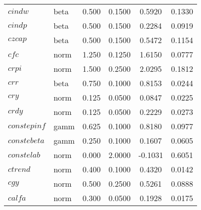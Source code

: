 \begin{center}
\begin{longtable}{llcccc}
$cindw$ & beta &   0.500 & 0.1500 &   0.5920 &  0.1330 \\ 
$cindp$ & beta &   0.500 & 0.1500 &   0.2284 &  0.0919 \\ 
$czcap$ & beta &   0.500 & 0.1500 &   0.5472 &  0.1154 \\ 
$cfc$ & norm &   1.250 & 0.1250 &   1.6150 &  0.0777 \\ 
$crpi$ & norm &   1.500 & 0.2500 &   2.0295 &  0.1812 \\ 
$crr$ & beta &   0.750 & 0.1000 &   0.8153 &  0.0244 \\ 
$cry$ & norm &   0.125 & 0.0500 &   0.0847 &  0.0225 \\ 
$crdy$ & norm &   0.125 & 0.0500 &   0.2229 &  0.0273 \\ 
$constepinf$ & gamm &   0.625 & 0.1000 &   0.8180 &  0.0977 \\ 
$constebeta$ & gamm &   0.250 & 0.1000 &   0.1607 &  0.0605 \\ 
$constelab$ & norm &   0.000 & 2.0000 &  -0.1031 &  0.6051 \\ 
$ctrend$ & norm &   0.400 & 0.1000 &   0.4320 &  0.0142 \\ 
$cgy$ & norm &   0.500 & 0.2500 &   0.5261 &  0.0888 \\ 
$calfa$ & norm &   0.300 & 0.0500 &   0.1928 &  0.0175 \\ 
\end{longtable}
 \end{center}
